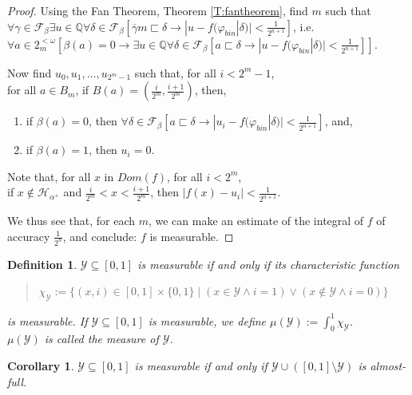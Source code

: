 \documentclass[a4paper]{amsart}
\theoremstyle{plain}
\newtheorem{corollary}[theorem]{Corollary}
\newtheorem{definition}{Definition}
\begin{document}
\begin{proof}
\smallskip Using the Fan Theorem, Theorem \ref{T:fantheorem}, find $m$ such that\\$\forall \gamma \in \mathcal{F}_\beta  \exists u \in \mathbb{Q}\forall \delta \in \mathcal{F}_\beta[ \overline \gamma m \sqsubset \delta\rightarrow |u-f(\varphi_{bin}|\delta)|<\frac{1}{2^{n+1}}]$, i.e.
\\ $\forall a \in 2^{<\omega}_m[\beta(a)=0\rightarrow   \exists u \in \mathbb{Q}\forall \delta \in \mathcal{F}_\beta[ a \sqsubset \delta\rightarrow |u-f(\varphi_{bin}|\delta)|<\frac{1}{2^{n+1}}]]$.  

\smallskip Now find $u_0, u_1, \ldots, u_{2^m-1}$ such that, for all $i<2^m-1$, \\for all $a\in B_m$, if $B(a) = (\frac{i}{2^m}, \frac{i+1}{2^m})$, then, \begin{enumerate} \item if $\beta(a)=0$, then $\forall \delta \in \mathcal{F}_\beta[ a\sqsubset \delta \rightarrow |u_i-f(\varphi_{bin}|\delta)|<\frac{1}{2^{n+1}}]$, and, \item if $\beta(a)=1$, then $u_i=0$. \end{enumerate}  

Note that, for all $x$ in $Dom(f)$, for all $i<2^m$, \\if $x \notin \mathcal{H}_{\alpha^+}$ and $\frac{i}{2^m}<x<\frac{i+1}{2^m}$, then $|f(x)-u_i|<\frac{1}{2^{n+1}}$. 

\smallskip We thus see that, for each $m$, we can make an estimate of the integral of $f$ of accuracy $\frac{1}{2^n}$, and conclude:   $f$ is measurable. 
\end{proof}
\begin{definition} $\mathcal{Y}\subseteq [0,1]$ is \emph{measurable} if and only if its characteristic function \begin{quote} $\chi_\mathcal{Y}:=\{(x,i)\in [0,1]\times\{0,1\}\mid (x \in \mathcal{Y} \wedge i=1)\vee (x \notin \mathcal{Y} \wedge i=0)\}$ \end{quote} is measurable. If $\mathcal{Y}\subseteq [0,1]$ is measurable, we define  $\mu(\mathcal{Y}) := \int_0^1\chi_\mathcal{Y}$. \\ $\mu(\mathcal{Y})$ is called the \emph{measure} of $\mathcal{Y}$. \end{definition}

\begin{corollary}\label{Cor:almostfull} $\mathcal{Y}\subseteq [0,1]$ is measurable if and only if $\mathcal{Y}\cup ([0,1]\setminus\mathcal{Y})$ is almost-full. \end{corollary}
\end{document}
